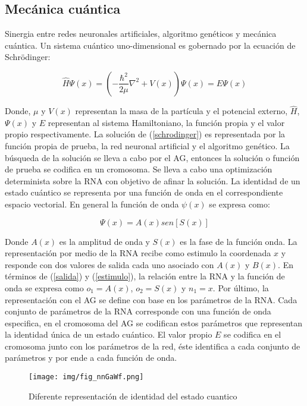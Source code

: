 \subsection{Mec\'anica cu\'antica}

Sinergia entre redes neuronales artificiales, algoritmo
gen\'eticos y mec\'anica cu\'antica. Un sistema cu\'antico
uno-dimensional es gobernado por la ecuaci\'on de Schr\"odinger:

\begin{equation}
	\widehat{H}\Psi(x)=(-\frac{\hbar^2}{2\mu}\nabla^2+V(x))\Psi(x)=E\Psi(x)
	\label{schrodinger}
\end{equation}

Donde, $\mu$ y $V(x)$ representan la masa de la part\'icula y el
potencial externo, $\widehat{H}$, $\Psi(x)$ y $E$ representan al sistema
Hamiltoniano, la funci\'on propia y el valor propio respectivamente.
La soluci\'on de (\ref{schrodinger}) es representada por la funci\'on
propia de prueba, la red neuronal artificial y el algoritmo
gen\'etico. La b\'usqueda de la soluci\'on se lleva a cabo por el
AG, entonces la soluci\'on o funci\'on de prueba se codifica en
un cromosoma. Se lleva a cabo una optimizaci\'on determinista
sobre la RNA con objetivo de afinar la soluci\'on. La identidad
de un estado cu\'antico se representa por una funci\'on de onda
en el correspondiente espacio vectorial. En general la funci\'on
de onda $\psi(x)$ se expresa como: 

\begin{equation}
	\Psi(x)=A(x)sen[S(x)]\label{fonda}
\end{equation}

Donde $A(x)$ es la amplitud de onda y $S(x)$ es la fase de la
funci\'on onda. La representaci\'on por medio de la RNA recibe
como estimulo la coordenada $x$ y responde con dos valores
de salida cada uno asociado con $A(x)$ y $B(x)$. En t\'erminos
de (\ref{salida}) y (\ref{estimulo}), la relaci\'on entre la RNA y la funci\'on de onda
se expresa como $o_1=A(x)$, $o_2=S(x)$ y $n_1=x$. Por
\'ultimo, la representaci\'on con el AG se define con base en
los par\'ametros de la RNA. Cada conjunto de par\'ametros de
la RNA corresponde con una funci\'on de onda especifica, en
el cromosoma del AG se codifican estos par\'ametros que representan
la identidad \'unica de un estado cu\'antico. El valor
propio $E$ se codifica en el cromosoma junto con los par\'ametros
de la red, \'este identifica a cada conjunto de par\'ametros y
por ende a cada funci\'on de onda.

\begin{figure}[H]
	\centering
	\texttt{[image: img/fig\_nnGaWf.png]}
	\caption{Diferente representaci\'on de identidad del estado cuantico}
	\label{fig:nnGaWf}
\end{figure}

